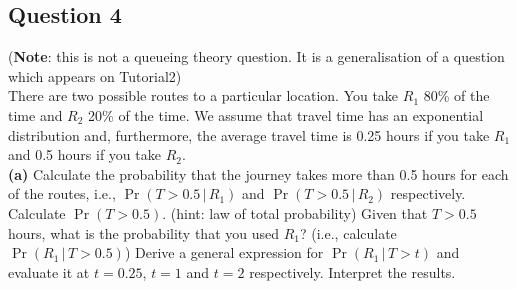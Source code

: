 \subsection*{Question 4}
{\footnotesize({\bf Note}: this is not a queueing theory question. It is a generalisation of a question which appears on Tutorial2)}\\[0.1cm]
There are two possible routes to a particular location. You take $R_1$ 80\% of the time and $R_2$ 20\% of the time. We assume that travel time has an exponential distribution and, furthermore, the average travel time is 0.25 hours if you take $R_1$ and 0.5 hours if you take $R_2$.\\[-0.2cm]

{\bf(a)} Calculate the probability that the journey takes more than 0.5 hours for each of the routes, i.e., $\Pr(T > 0.5\,|\,R_1)$ and $\Pr(T > 0.5\,|\,R_2)$ respectively.  Calculate $\Pr(T > 0.5)$. (hint: law of total probability)  Given that $T>0.5$ hours, what is the probability that you used $R_1$? (i.e., calculate $\Pr(R_1\,|\,T>0.5)$)  Derive a general expression for $\Pr(R_1\,|\,T>t)$ and evaluate it at $t=0.25$, $t = 1$ and $t = 2$ respectively. Interpret the results.










